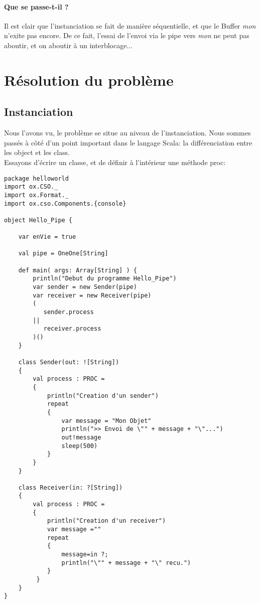 \documentclass[a4paper,11pt,french]{report}
\begin{document}
\paragraph{Que se passe-t-il ?} Il est clair que l'instanciation se fait de manière séquentielle, et que le Buffer \textit{mon} n'exite pas encore. De ce fait, l'essai de l'envoi via le pipe vers \textit{mon} ne peut pas aboutir, et on aboutir à un interblocage...

\section{Résolution du problème}
\subsection{Instanciation}

Nous l'avons vu, le problème se situe au niveau de l'instanciation. Nous sommes passés à c\^oté d'un point important dans le langage Scala: la différenciation entre les \textsf{object} et les \textsf{class}.\\

Essayons d'écrire un classe, et de définir à l'intérieur une méthode \textsf{proc}:

\begin{lstlisting}[frame=trBL]
package helloworld
import ox.CSO._
import ox.Format._
import ox.cso.Components.{console}

object Hello_Pipe {

    var enVie = true

    val pipe = OneOne[String]

    def main( args: Array[String] ) {
        println("Debut du programme Hello_Pipe")
        var sender = new Sender(pipe)
        var receiver = new Receiver(pipe)
        ( 
           sender.process
        || 
           receiver.process
        )()
    }

    class Sender(out: ![String])
    {
        val process : PROC =
        { 
            println("Creation d'un sender")
            repeat 
            {
                var message = "Mon Objet"
                println(">> Envoi de \"" + message + "\"...")
                out!message
                sleep(500)
            }
        }  
    }

    class Receiver(in: ?[String])
    {
        val process : PROC =
        { 
            println("Creation d'un receiver")
            var message =""
            repeat 
            {
                message=in ?; 
                println("\"" + message + "\" recu.")
            }
         }  
    }   
}
\end{lstlisting}
\bigskip
\end{document}
